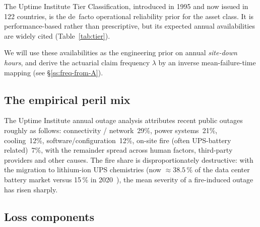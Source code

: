 \documentclass[11pt,a4paper]{article}
\theoremstyle{ia}
\newcommand{\1}{\mathbf{1}}
\begin{document}
The Uptime Institute Tier Classification, introduced in 1995 and now
issued in 122 countries, is the de~facto operational reliability
prior for the asset class. It is performance-based rather than
prescriptive, but its expected annual availabilities are widely cited
(Table~\ref{tab:tier}).

\begin{table}[ht]
\centering\footnotesize
\caption{Uptime Institute Tier classification and implied availability.}\label{tab:tier}
\end{table}

We will use these availabilities as the engineering prior on annual
\emph{site-down hours}, and derive the actuarial claim
frequency $\lambda$ by an inverse mean-failure-time mapping (see
\S\ref{ss:freq-from-A}).

\subsection{The empirical peril mix}\label{ss:perils}

The Uptime Institute annual outage analysis attributes recent
public outages roughly as follows: connectivity / network~29\%,
power systems~21\%, cooling~12\%, software/configuration~12\%,
on-site fire (often UPS-battery related)~7\%, with the remainder
spread across human factors, third-party providers and other causes.
The fire share is disproportionately destructive: with the migration
to lithium-ion UPS chemistries (now $\approx 38.5\,\%$ of the data center
battery market versus 15\,\% in 2020~\citep{NetworkWorld2023}), the
mean severity of a fire-induced outage has risen sharply.

\subsection{Loss components}\label{ss:components}
\end{document}
